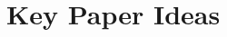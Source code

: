 \documentclass[12]{article}
\newcommand{\Z}{\mathbb{Z}}
\theoremstyle{definition}
\begin{document}
	
	

	
	
	
	\newpage
	\section{Key Paper Ideas}
	
\end{document}
